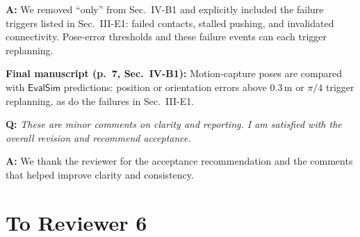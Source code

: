 \documentclass[11pt]{article}
\newcommand{\change}[1]{{\color{blue}#1}}
\begin{document}
\noindent \textbf{A:}
We removed ``only'' from Sec.~IV-B1 and explicitly included the failure
triggers listed in Sec.~III-E1: failed contacts, stalled pushing, and
invalidated connectivity. Pose-error thresholds and these failure events
can each trigger replanning.
\par\smallskip\noindent\textbf{Final manuscript (p.~7, Sec.~IV-B1):}
\change{Motion-capture poses are compared with $\mathsf{EvalSim}$ predictions:
position or orientation errors above $0.3$\,m or $\pi/4$ trigger replanning,
as do the failures in Sec.~III-E1.}


\begin{shaded*}
\noindent \textbf{Q:}
{\itshape
These are minor comments on clarity and reporting. I am satisfied with
the overall revision and recommend acceptance.
}
\end{shaded*}

\noindent \textbf{A:}
We thank the reviewer for the acceptance recommendation and the comments that helped improve clarity and consistency.

\newpage
\section*{To Reviewer 6}
\end{document}
